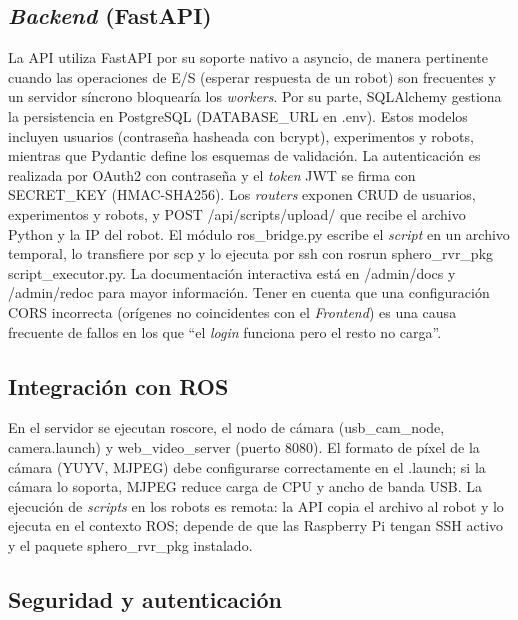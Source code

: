 \documentclass[12pt]{article}
\numberwithin{figure}{section}
\numberwithin{table}{section}
\def\code#1{#1}%
\def\file#1{#1}%
\newcommand{\code}[1]{\textcolor{codeblue}{\url{#1}}}
\newcommand{\file}[1]{\textcolor{darkblue}{\texttt{#1}}}
\begin{document}
\subsection{\textit{Backend} (FastAPI)}

La API utiliza FastAPI por su soporte nativo a asyncio, de manera pertinente cuando las operaciones de E/S (esperar respuesta de un robot) son frecuentes y un servidor síncrono bloquearía los \textit{workers}. Por su parte, SQLAlchemy gestiona la persistencia en PostgreSQL (\code{DATABASE\_URL} en \file{.env}). Estos modelos incluyen usuarios (contraseña hasheada con bcrypt), experimentos y robots, mientras que Pydantic define los esquemas de validación. La autenticación es realizada por OAuth2 con contraseña y el \textit{token} JWT se firma con \code{SECRET\_KEY} (HMAC-SHA256). Los \textit{routers} exponen CRUD de usuarios, experimentos y robots, y \code{POST /api/scripts/upload/} que recibe el archivo Python y la IP del robot. El módulo \file{ros\_bridge.py} escribe el \textit{script} en un archivo temporal, lo transfiere por \code{scp} y lo ejecuta por \code{ssh} con \code{rosrun sphero\_rvr\_pkg script\_executor.py}. La documentación interactiva está en \code{/admin/docs} y \code{/admin/redoc} para mayor información. Tener en cuenta que una configuración CORS incorrecta (orígenes no coincidentes con el \textit{Frontend}) es una causa frecuente de fallos en los que ``el \textit{login} funciona pero el resto no carga''.


\subsection{Integración con ROS}

En el servidor se ejecutan \code{roscore}, el nodo de cámara (\code{usb\_cam\_node}, \file{camera.launch}) y \code{web\_video\_server} (puerto 8080). El formato de píxel de la cámara (YUYV, MJPEG) debe configurarse correctamente en el \file{.launch}; si la cámara lo soporta, MJPEG reduce carga de CPU y ancho de banda USB. La ejecución de \textit{scripts} en los robots es remota: la API copia el archivo al robot y lo ejecuta en el contexto ROS; depende de que las Raspberry Pi tengan SSH activo y el paquete \code{sphero\_rvr\_pkg} instalado.


\subsection{Seguridad y autenticación}
\end{document}
